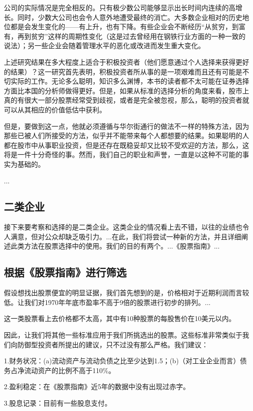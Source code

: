 \documentclass[12pt,oneside]{book}
\begin{document}
公司的实际情况是完全相反的。只有极少数公司能够显示出长时间内连续的高增长。同时，少数大公司也会令人意外地遭受最终的消亡。大多数企业相对的历史地位都是会发生变化的——有上升，也有下降。有些企业会不断经历“从贫穷，到富有，再到贫穷”这样的周期性变化（这是过去曾经用在钢铁行业方面的一种一致的说法）；另一些企业会随着管理水平的恶化或改进而发生重大变化。

上述研究结果在多大程度上适合于积极投资者（他们愿意通过个人选择来获得更好的结果）？这一研究首先表明，积极投资者所从事的是一项艰难而且还有可能是不切实际的工作。无论多么聪明，知识多么渊博，本书的读者都不太可能在证券选择方面比本国的分析师做得更好。但是，如果从标准的选择分析的角度来看，股市上真的有很大一部分股票经常受到歧视，或者是完全被忽视，那么，聪明的投资者就可以从其相应的价值低估中获利。

但是，要做到这一点，他就必须遵循与华尔街通行的做法不一样的特殊方法，因为那些已被人们所接受的方法，似乎并不能带来每个人都想要的结果。如果聪明的人都在股市中从事职业投资，但是还存在既稳妥却又比较不受欢迎的方法，那么，这将是一件十分奇怪的事。然而，我们自己的职业和声誉，一直是以这种不可能的事实为基础的。

...


\subsection{二类企业}
接下来要考察和选择的是二类企业。这类企业的情况看上去不错，以往的业绩也令人满意，但对公众却缺乏吸引力。...在此，我们将尝试一种新的方法，并且详细阐述此类方法在股票选择中的使用。我们的目的有两个。...《股票指南》...


\subsection{根据《股票指南》进行筛选}
假设想找出股票便宜的明显证据，我们首先想到的是，价格相对于近期利润而言较低。让我们对1970年年底市盈率不高于9倍的股票进行初步的排列。...

这一类股票看上去价格都不太高，其中有10种股票的每股售价在10美元以内。

因此，让我们将其他一些标准应用于我们所挑选出的股票。这些标准非常类似于我们向防御型投资者所提出的建议，只不过没有那么严格。我们建议：

1.财务状况：(a)流动资产与流动负债之比至少达到1.5；(b)（对工业企业而言）债务占净流动资产的比例不高于110\%。

2.盈利稳定：在《股票指南》近5年的数据中没有出现过赤字。

3.股息记录：目前有一些股息支付。
\end{document}
